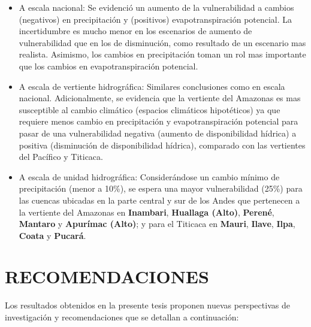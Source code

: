 \documentclass[12pt]{article}
\begin{document}
\begin{itemize}
    \begin{itemize}
        \item A escala nacional: Se evidenció un aumento de la vulnerabilidad a cambios (negativos) en precipitación y (positivos) evapotranspiración potencial. La incertidumbre es mucho menor en los escenarios de aumento de vulnerabilidad que en los de disminución, como resultado de un escenario mas realista. Asimismo, los cambios en precipitación toman un rol mas importante que los cambios en evapotranspiración potencial. 
        \item A escala de vertiente hidrográfica: Similares conclusiones como en escala nacional. Adicionalmente, se evidencia que la vertiente del Amazonas es mas susceptible al cambio climático (espacios climáticos hipotéticos) ya que requiere menos cambio en precipitación y evapotranspiración potencial para pasar de una vulnerabilidad negativa (aumento de disponibilidad hídrica) a positiva (disminución de disponibilidad hídrica), comparado con las vertientes del Pacífico y Titicaca.
        \item A escala de unidad hidrográfica: Considerándose un cambio mínimo de precipitación (menor a 10\%), se espera una mayor vulnerabilidad (25\%) para las cuencas ubicadas en la parte central y sur de los Andes que pertenecen a la vertiente del Amazonas en \textbf{Inambari}, \textbf{Huallaga (Alto)}, \textbf{Perené}, \textbf{Mantaro} y \textbf{Apurímac (Alto)}; y para el Titicaca en \textbf{Mauri}, \textbf{Ilave}, \textbf{Ilpa}, \textbf{Coata} y \textbf{Pucará}.
    \end{itemize}
    
\end{itemize}


\clearpage
\vspace*{0.5mm}
\section{RECOMENDACIONES}

\thispagestyle{empty}

Los resultados obtenidos en la presente tesis proponen nuevas perspectivas de investigación y recomendaciones que se detallan a continuación:
\end{document}
